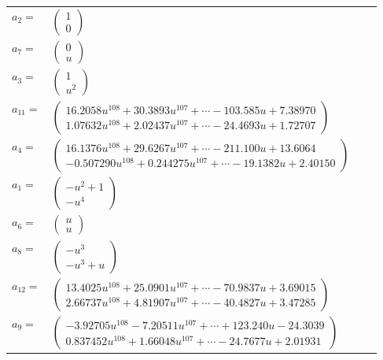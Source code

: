 \documentclass[1p]{elsarticle_modified}
\theoremstyle{definition}
\begin{document}
\begin{tabular}{m{7pt} m{180pt} m{7pt} m{180pt} }
\flushright $a_{2}=$&$\begin{pmatrix}1\\0\end{pmatrix}$ \\
\flushright $a_{7}=$&$\begin{pmatrix}0\\u\end{pmatrix}$ \\
\flushright $a_{3}=$&$\begin{pmatrix}1\\u^2\end{pmatrix}$ \\
\flushright $a_{11}=$&$\begin{pmatrix}16.2058 u^{108}+30.3893 u^{107}+\cdots-103.585 u+7.38970\\1.07632 u^{108}+2.02437 u^{107}+\cdots-24.4693 u+1.72707\end{pmatrix}$ \\
\flushright $a_{4}=$&$\begin{pmatrix}16.1376 u^{108}+29.6267 u^{107}+\cdots-211.100 u+13.6064\\-0.507290 u^{108}+0.244275 u^{107}+\cdots-19.1382 u+2.40150\end{pmatrix}$ \\
\flushright $a_{1}=$&$\begin{pmatrix}- u^2+1\\- u^4\end{pmatrix}$ \\
\flushright $a_{6}=$&$\begin{pmatrix}u\\u\end{pmatrix}$ \\
\flushright $a_{8}=$&$\begin{pmatrix}- u^3\\- u^3+u\end{pmatrix}$ \\
\flushright $a_{12}=$&$\begin{pmatrix}13.4025 u^{108}+25.0901 u^{107}+\cdots-70.9837 u+3.69015\\2.66737 u^{108}+4.81907 u^{107}+\cdots-40.4827 u+3.47285\end{pmatrix}$ \\
\flushright $a_{9}=$&$\begin{pmatrix}-3.92705 u^{108}-7.20511 u^{107}+\cdots+123.240 u-24.3039\\0.837452 u^{108}+1.66048 u^{107}+\cdots-24.7677 u+2.01931\end{pmatrix}$ \\

\end{tabular}
\end{document}
